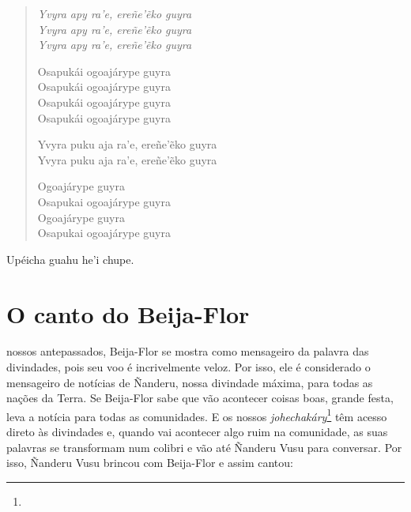 \begin{verse}
\itshape
Yvyra apy ra'e, ereñe'ẽko guyra\\
Yvyra apy ra'e, ereñe'ẽko guyra\\
Yvyra apy ra'e, ereñe'ẽko guyra

Osapukái ogoajárype guyra\\
Osapukái ogoajárype guyra\\
Osapukái ogoajárype guyra\\
Osapukái ogoajárype guyra

Yvyra puku aja ra'e, ereñe'ẽko guyra\\
Yvyra puku aja ra'e, ereñe'ẽko guyra

Ogoajárype guyra\\
Osapukai ogoajárype guyra\\
Ogoajárype guyra\\
Osapukai ogoajárype guyra
\end{verse}

Upéicha guahu he'i chupe.

\chapter{O canto do Beija-Flor}

 nossos antepassados, Beija-Flor se mostra como mensageiro da
palavra das divindades, pois seu voo é incrivelmente veloz. Por isso,
ele é considerado o mensageiro de notícias de Ñanderu, nossa divindade
máxima, para todas as nações da Terra. Se Beija-Flor sabe que vão
acontecer coisas boas, grande festa, leva a notícia para todas as
comunidades. E os nossos \emph{johechakáry}\footnote{} têm
acesso direto às divindades e, quando vai acontecer algo ruim na
comunidade, as suas palavras se transformam num colibri e vão até
Ñanderu Vusu para conversar. Por isso, Ñanderu Vusu brincou com
Beija-Flor e assim cantou:

